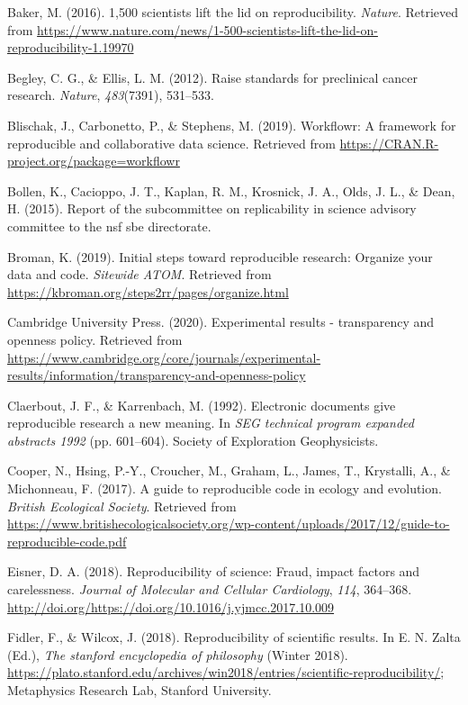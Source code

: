 \documentclass[12pt,twoside]{reedthesis}
\begin{document}
\hypertarget{ref-nature-crisis}{}
Baker, M. (2016). 1,500 scientists lift the lid on reproducibility.
\emph{Nature}. Retrieved from
\url{https://www.nature.com/news/1-500-scientists-lift-the-lid-on-reproducibility-1.19970}

\hypertarget{ref-begley2012raise}{}
Begley, C. G., \& Ellis, L. M. (2012). Raise standards for preclinical
cancer research. \emph{Nature}, \emph{483}(7391), 531--533.

\hypertarget{ref-R-workflowr}{}
Blischak, J., Carbonetto, P., \& Stephens, M. (2019). Workflowr: A
framework for reproducible and collaborative data science. Retrieved
from \url{https://CRAN.R-project.org/package=workflowr}

\hypertarget{ref-arlington}{}
Bollen, K., Cacioppo, J. T., Kaplan, R. M., Krosnick, J. A., Olds, J.
L., \& Dean, H. (2015). Report of the subcommittee on replicability in
science advisory committee to the nsf sbe directorate.

\hypertarget{ref-broman}{}
Broman, K. (2019). Initial steps toward reproducible research: Organize
your data and code. \emph{Sitewide ATOM}. Retrieved from
\url{https://kbroman.org/steps2rr/pages/organize.html}

\hypertarget{ref-exp-results}{}
Cambridge University Press. (2020). Experimental results - transparency
and openness policy. Retrieved from
\url{https://www.cambridge.org/core/journals/experimental-results/information/transparency-and-openness-policy}

\hypertarget{ref-claerbout}{}
Claerbout, J. F., \& Karrenbach, M. (1992). Electronic documents give
reproducible research a new meaning. In \emph{SEG technical program
expanded abstracts 1992} (pp. 601--604). Society of Exploration
Geophysicists.

\hypertarget{ref-cooper2017guide}{}
Cooper, N., Hsing, P.-Y., Croucher, M., Graham, L., James, T.,
Krystalli, A., \& Michonneau, F. (2017). A guide to reproducible code in
ecology and evolution. \emph{British Ecological Society}. Retrieved from
\url{https://www.britishecologicalsociety.org/wp-content/uploads/2017/12/guide-to-reproducible-code.pdf}

\hypertarget{ref-eisner-reproducibility}{}
Eisner, D. A. (2018). Reproducibility of science: Fraud, impact factors
and carelessness. \emph{Journal of Molecular and Cellular Cardiology},
\emph{114}, 364--368.
\url{http://doi.org/https://doi.org/10.1016/j.yjmcc.2017.10.009}

\hypertarget{ref-sep-scientific-reproducibility}{}
Fidler, F., \& Wilcox, J. (2018). Reproducibility of scientific results.
In E. N. Zalta (Ed.), \emph{The stanford encyclopedia of philosophy}
(Winter 2018).
\url{https://plato.stanford.edu/archives/win2018/entries/scientific-reproducibility/};
Metaphysics Research Lab, Stanford University.
\end{document}
